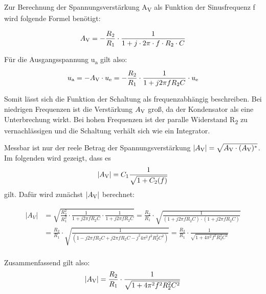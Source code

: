 Zur Berechnung der Spannungsverstärkung A\textsubscript{V} als
Funktion der Sinusfrequenz f wird folgende Formel benötigt:

\begin{equation}
    A\textsubscript{V} = -\frac{R_2}{R_1} \cdot \frac{1}{1 + j \cdot 2 \pi \cdot f \cdot R_2 \cdot C}
    \label{eq:AV}
\end{equation}

Für die Ausgangsspannung u\textsubscript{a} gilt also:
\begin{equation}
    u\textsubscript{a} = -A\textsubscript{V} \cdot u\textsubscript{e} = -\frac{R_2}{R_1} \cdot \frac{1}{1 + j 2 \pi f R_2 C} \cdot u\textsubscript{e}
    \label{eq:AV}
\end{equation}

Somit lässt sich die Funktion der Schaltung als frequenzabhängig beschreiben.
Bei niedrigen Frequenzen ist die Verstärkung $A\textsubscript{V}$ groß,
da der Kondensator als eine Unterbrechung wirkt. Bei hohen Frequenzen
ist der paralle Widerstand R\textsubscript{2} zu vernachlässigen und
die Schaltung verhält sich wie ein Integrator.


Messbar ist nur der reele Betrag der Spannungsverstärkung  
$|A\textsubscript{V}| = \sqrt{A\textsubscript{V} \cdot (A\textsubscript{V})^{*}} $.
Im folgenden wird gezeigt, dass es
\begin{equation}
    |A\textsubscript{V}| = C_1\frac{1}{\sqrt{1 + C_2(f)}}
    \label{eq:AV2}
\end{equation} 
gilt. Dafür wird zunächst 
$|A\textsubscript{V}|$ berechnet:

\[
    \begin{aligned}
    |A_V| & = \sqrt{\frac{R_2^2}{R_1^2} \cdot \frac{1}{1 + j 2 \pi f R_2 C} \cdot \frac{1}{1 + j 2 \pi f R_2 C}}
    = \frac{R_2}{R_1} \cdot \sqrt{\frac{1}{(1 + j 2 \pi f R_2 C) \cdot (1 + j 2 \pi f R_2 C)}} \\
    & = \frac{R_2}{R_1} \cdot \sqrt{\frac{1}{(1 - j 2 \pi f R_2 C + j 2 \pi f R_2 C - j^2 4 \pi^2 f^2 R_2 ^ 2 C^2)}}
    = \frac{R_2}{R_1} \cdot \frac{1}{\sqrt{1 + 4 \pi^2 f^2 R_2 ^ 2 C^2}} \\
    \end{aligned}
\]

Zusammenfassend gilt also:
\begin{equation}
    |A\textsubscript{V}| = \frac{R_2}{R_1} \cdot \frac{1}{\sqrt{1 + 4 \pi^2 f^2 R_2 ^ 2 C^2}}
    \label{eq:AV3}
\end{equation}


